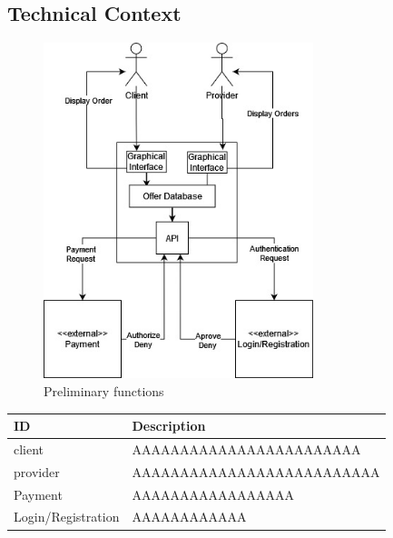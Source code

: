 \subsection{Technical Context}

\begin{figure}[H]
    \centering
    \includegraphics[width=0.7\textwidth]{assets/technical_context.jpg}
    \caption{Preliminary functions}
    \label{fig:preliminary_use_case}
\end{figure}

\begin{table}[H]
    \begin{tabularx}{\textwidth}{lX}
    \toprule
    ID & Description   \\
    \midrule
    \gls{client} & AAAAAAAAAAAAAAAAAAAAAAAA \\
    \gls{provider} & AAAAAAAAAAAAAAAAAAAAAAAAAA \\
    Payment & AAAAAAAAAAAAAAAAA \\
    Login/Registration & AAAAAAAAAAAA  \\
    \bottomrule
    \end{tabularx}
\end{table}